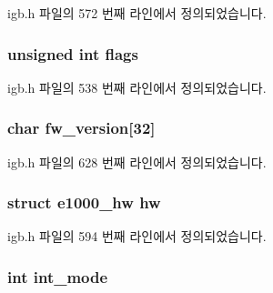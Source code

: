 igb.\+h 파일의 572 번째 라인에서 정의되었습니다.

\subsubsection[{\texorpdfstring{flags}{flags}}]{\setlength{\rightskip}{0pt plus 5cm}unsigned int flags}\hypertarget{structigb__adapter_ac92588540e8c1d014a08cd8a45462b19}{}\label{structigb__adapter_ac92588540e8c1d014a08cd8a45462b19}


igb.\+h 파일의 538 번째 라인에서 정의되었습니다.

\subsubsection[{\texorpdfstring{fw\+\_\+version}{fw_version}}]{\setlength{\rightskip}{0pt plus 5cm}char fw\+\_\+version\mbox{[}32\mbox{]}}\hypertarget{structigb__adapter_a0c0348cd3d20dead23c571d91ca11a8f}{}\label{structigb__adapter_a0c0348cd3d20dead23c571d91ca11a8f}


igb.\+h 파일의 628 번째 라인에서 정의되었습니다.

\subsubsection[{\texorpdfstring{hw}{hw}}]{\setlength{\rightskip}{0pt plus 5cm}struct {\bf e1000\+\_\+hw} hw}\hypertarget{structigb__adapter_a7d5953861471302be6287c989e0b20ba}{}\label{structigb__adapter_a7d5953861471302be6287c989e0b20ba}


igb.\+h 파일의 594 번째 라인에서 정의되었습니다.

\subsubsection[{\texorpdfstring{int\+\_\+mode}{int_mode}}]{\setlength{\rightskip}{0pt plus 5cm}int int\+\_\+mode}\hypertarget{structigb__adapter_aae097d90508f127067d914fe2e92a28d}{}\label{structigb__adapter_aae097d90508f127067d914fe2e92a28d}


